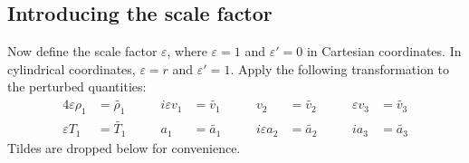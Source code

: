 \documentclass[11pt, fleqn]{article}
\newcommand{\eps}{\varepsilon}
\begin{document}
\subsection{Introducing the scale factor}
Now define the scale factor $\eps$, where $\eps = 1$ and $\eps' = 0$ in Cartesian coordinates. In cylindrical coordinates, $\eps = r$ and $\eps' = 1$. Apply the following transformation to the perturbed quantities:
\begin{alignat*}{4}
	\eps \rho_1 &= \widetilde{\rho_1}		\qquad	&	i\eps v_1 &= \widetilde{v_1}		\qquad&		v_2 		  &= \widetilde{v_2}		\qquad&			\eps v_3 &= \widetilde{v_3}			\\
	\eps T_1	&= \widetilde{T_1}					&		  a_1 &= \widetilde{a_1}			  &		i\eps a_2	  &= \widetilde{a_2}			  &			ia_3 	 &= \widetilde{a_3}
\end{alignat*}
Tildes are dropped below for convenience.
\end{document}
